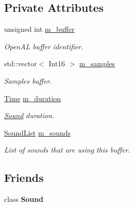 \subsection*{Private Attributes}
\begin{DoxyCompactItemize}
\item 
\mbox{\label{classsf_1_1_sound_buffer_a90bd207655b9b1a312f6ebb7ae783da2}} 
unsigned int \mbox{\hyperlink{classsf_1_1_sound_buffer_a90bd207655b9b1a312f6ebb7ae783da2}{m\+\_\+buffer}}
\begin{DoxyCompactList}\small\item\em Open\+AL buffer identifier. \end{DoxyCompactList}\item 
\mbox{\label{classsf_1_1_sound_buffer_a6c954068fe46d5567f2c94eb3c79c5f3}} 
std\+::vector$<$ Int16 $>$ \mbox{\hyperlink{classsf_1_1_sound_buffer_a6c954068fe46d5567f2c94eb3c79c5f3}{m\+\_\+samples}}
\begin{DoxyCompactList}\small\item\em Samples buffer. \end{DoxyCompactList}\item 
\mbox{\label{classsf_1_1_sound_buffer_ad7a031590faff910c94cc442864eabd3}} 
\mbox{\hyperlink{classsf_1_1_time}{Time}} \mbox{\hyperlink{classsf_1_1_sound_buffer_ad7a031590faff910c94cc442864eabd3}{m\+\_\+duration}}
\begin{DoxyCompactList}\small\item\em \mbox{\hyperlink{classsf_1_1_sound}{Sound}} duration. \end{DoxyCompactList}\item 
\mbox{\label{classsf_1_1_sound_buffer_aa6fc10c994c0aaca70567e8fd1ddabc3}} 
\mbox{\hyperlink{classsf_1_1_sound_buffer_a0c4edd90a4c83b07369e84f14b385196}{Sound\+List}} \mbox{\hyperlink{classsf_1_1_sound_buffer_aa6fc10c994c0aaca70567e8fd1ddabc3}{m\+\_\+sounds}}
\begin{DoxyCompactList}\small\item\em List of sounds that are using this buffer. \end{DoxyCompactList}\end{DoxyCompactItemize}
\subsection*{Friends}
\begin{DoxyCompactItemize}
\item 
\mbox{\label{classsf_1_1_sound_buffer_a50914f77c7cf4fb97616c898c5291f4b}} 
class {\bfseries Sound}
\end{DoxyCompactItemize}


